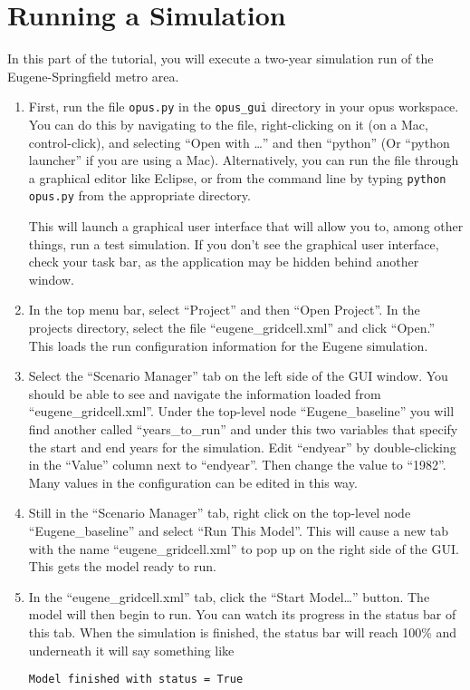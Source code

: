 \documentclass{howto}
\begin{document}
\section*{Running a Simulation}

In this part of the tutorial, you will execute a two-year simulation run of the
Eugene-Springfield metro area.

\begin{enumerate}

\item First, run the file \verb|opus.py| in the \verb|opus_gui| directory
in your opus workspace.  You can do this by navigating to the file,
right-clicking on it (on a Mac, control-click), and selecting ``Open with
\dots'' and then ``python'' (Or ``python launcher'' if you are using a
Mac).  Alternatively, you can run the file through a graphical editor like
Eclipse, or from the command line by typing \verb|python opus.py| from the
appropriate directory.

This will launch a graphical user interface that will allow you to, among
other things, run a test simulation.  If you don't see the graphical user
interface, check your task bar, as the application may be hidden behind
another window.

\item In the top menu bar, select ``Project'' and then ``Open Project''.  In the projects directory, select the file ``eugene_gridcell.xml'' and click ``Open.''  This loads the run configuration information for the Eugene simulation.

\item Select the ``Scenario Manager'' tab on the left side of the GUI window.  You should be able to see and navigate the information loaded from ``eugene_gridcell.xml''.  Under the top-level node ``Eugene_baseline'' you will find another called ``years_to_run'' and under this two variables that specify the start and end years for the simulation.  Edit ``endyear'' by double-clicking in the ``Value'' column next to ``endyear''.  Then change the value to ``1982''.  Many values in the configuration can be edited in this way.

\item Still in the ``Scenario Manager'' tab, right click on the top-level node ``Eugene_baseline'' and select ``Run This Model''.  This will cause a new tab with the name ``eugene_gridcell.xml'' to pop up on the right side of the GUI.  This gets the model ready to run.

\item In the ``eugene_gridcell.xml'' tab, click the ``Start Model\ldots''
button.  The model will then begin to run. You can watch its progress in
the status bar of this tab.  
When the simulation is finished,
the status bar will reach 100\% and underneath it will say something like
\begin{verbatim}Model finished with status = True\end{verbatim}

\end{enumerate}
\end{document}

